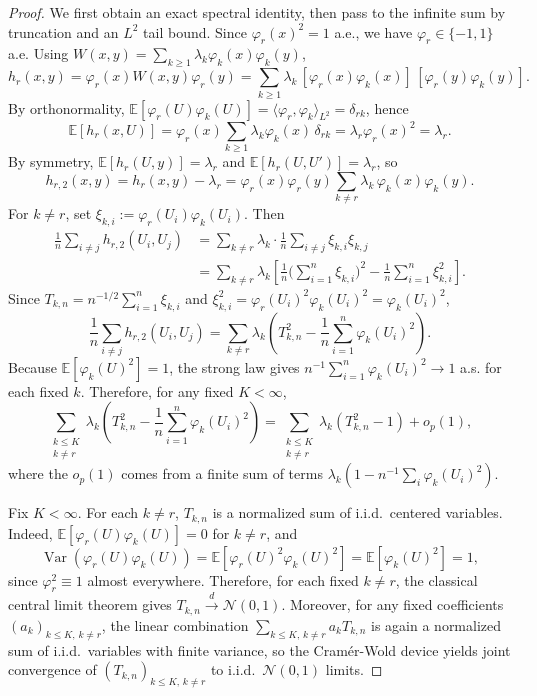 \documentclass[11pt]{article}
\theoremstyle{plain}
\theoremstyle{remark}
\DeclareMathOperator{\Var}{Var}
\begin{document}
\begin{proof}
We first obtain an exact spectral identity, then pass to the infinite sum by truncation and an $L^2$ tail bound. Since $\varphi_r(x)^2=1$ a.e., we have $\varphi_r\in\{-1,1\}$ a.e. Using
$W(x,y)=\sum_{k\ge1}\lambda_k\varphi_k(x)\varphi_k(y)$,
\[
h_r(x,y)=\varphi_r(x)W(x,y)\varphi_r(y)
=\sum_{k\ge1}\lambda_k\,[\varphi_r(x)\varphi_k(x)]\,[\varphi_r(y)\varphi_k(y)].
\]
By orthonormality, $\mathbb{E}[\varphi_r(U)\varphi_k(U)]=\langle \varphi_r,\varphi_k\rangle_{L^2}=\delta_{rk}$, hence
\[
\mathbb{E}[h_r(x,U)]
=
\varphi_r(x)\sum_{k\ge1}\lambda_k\varphi_k(x)\,\delta_{rk}
=
\lambda_r\varphi_r(x)^2=\lambda_r.
\]
By symmetry, $\mathbb{E}[h_r(U,y)]=\lambda_r$ and $\mathbb{E}[h_r(U,U')]=\lambda_r$, so
\[
h_{r,2}(x,y)=h_r(x,y)-\lambda_r
=\varphi_r(x)\varphi_r(y)\sum_{k\neq r}\lambda_k\,\varphi_k(x)\varphi_k(y).
\]
For $k\neq r$, set $\xi_{k,i}:=\varphi_r(U_i)\varphi_k(U_i)$. Then
\begin{align*}
\frac{1}{n}\sum_{i\neq j}h_{r,2}(U_i,U_j)
&=
\sum_{k\neq r}\lambda_k\cdot \frac{1}{n}\sum_{i\neq j}\xi_{k,i}\xi_{k,j}\\
&=
\sum_{k\neq r}\lambda_k\left[
\frac{1}{n}\Big(\sum_{i=1}^n\xi_{k,i}\Big)^2-\frac{1}{n}\sum_{i=1}^n\xi_{k,i}^2
\right].
\end{align*}
Since $T_{k,n}=n^{-1/2}\sum_{i=1}^n\xi_{k,i}$ and $\xi_{k,i}^2=\varphi_r(U_i)^2\varphi_k(U_i)^2=\varphi_k(U_i)^2$,
\[
\frac{1}{n}\sum_{i\neq j}h_{r,2}(U_i,U_j)
=
\sum_{k\neq r}\lambda_k\left(
T_{k,n}^2-\frac{1}{n}\sum_{i=1}^n\varphi_k(U_i)^2
\right).
\]
Because $\mathbb{E}[\varphi_k(U)^2]=1$, the strong law gives
$n^{-1}\sum_{i=1}^n\varphi_k(U_i)^2\to 1$ a.s. for each fixed $k$.
Therefore, for any fixed $K<\infty$,
\[
\sum_{\substack{k\le K\\ k\neq r}}\lambda_k\left(
T_{k,n}^2-\frac{1}{n}\sum_{i=1}^n\varphi_k(U_i)^2
\right)
=
\sum_{\substack{k\le K\\ k\neq r}}\lambda_k(T_{k,n}^2-1)+o_p(1),
\]
where the $o_p(1)$ comes from a finite sum of terms
$\lambda_k\left(1-n^{-1}\sum_i\varphi_k(U_i)^2\right)$.

Fix $K<\infty$. For each $k\neq r$, $T_{k,n}$ is a normalized sum of i.i.d.\ centered variables.
Indeed, $\mathbb{E}[\varphi_r(U)\varphi_k(U)]=0$ for $k\neq r$, and
\[
\Var(\varphi_r(U)\varphi_k(U))
=
\mathbb{E}[\varphi_r(U)^2\varphi_k(U)^2]
=
\mathbb{E}[\varphi_k(U)^2]
=
1,
\]
since $\varphi_r^2\equiv 1$ almost everywhere.
Therefore, for each fixed $k\neq r$, the classical central limit theorem gives
$T_{k,n}\xrightarrow{d}\mathcal{N}(0,1)$.
Moreover, for any fixed coefficients $(a_k)_{k\le K,\,k\neq r}$,
the linear combination $\sum_{k\le K,\,k\neq r} a_k T_{k,n}$ is again a normalized sum of i.i.d.\ variables
with finite variance, so the Cram\'er-Wold device yields joint convergence of
$(T_{k,n})_{k\le K,\,k\neq r}$ to i.i.d.\ $\mathcal{N}(0,1)$ limits.


\end{proof}
\end{document}

